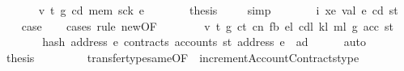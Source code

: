\begin{isabellebody}
\ \ \ \ \isamarkupfalse%
\ {\isacharparenleft}{\kern0pt}{}\ v\ t\ g\ cd{\isacharprime}{\kern0pt}\ mem{\isacharprime}{\kern0pt}\ sck{\isacharprime}{\kern0pt}\ e{\isacharprime}{\kern0pt}{\isacharparenright}{\kern0pt}\isanewline
\ \ \ \ \isamarkupfalse%
\ \isamarkupfalse%
\ {\isacharquery}{\kern0pt}thesis\ \isamarkupfalse%
\ {}{}\ \isamarkupfalse%
\ simp\isanewline
\ \ \isamarkupfalse%
\isanewline
{}\isamarkupfalse%
\isanewline
\ \ \isamarkupfalse%
\ {\isacharparenleft}{\kern0pt}{}{}\ i\ xe\ val\ e\ cd\ st{\isacharparenright}{\kern0pt}\isanewline
\ \ \isamarkupfalse%
\ {\isacharquery}{\kern0pt}case\isanewline
\ \ \isamarkupfalse%
\ {\isacharparenleft}{\kern0pt}cases\ rule{\isacharcolon}{\kern0pt}\ new{\isacharbrackleft}{\kern0pt}OF\ {}{}{\isacharparenleft}{\kern0pt}{}{\isacharparenright}{\kern0pt}{\isacharbrackright}{\kern0pt}{\isacharparenright}{\kern0pt}\isanewline
\ \ \ \ \isamarkupfalse%
\ {\isacharparenleft}{\kern0pt}{}\ v\ t\ g\ ct\ cn\ fb\ e\isactrlsub l\ cd\isactrlsub l\ k\isactrlsub l\ m\isactrlsub l\ g{\isacharprime}{\kern0pt}\ acc\ st{\isacharprime}{\kern0pt}{\isacharprime}{\kern0pt}{\isacharparenright}{\kern0pt}\isanewline
\ \ \ \ \isamarkupfalse%
\ \isamarkupfalse%
\ {\isachardoublequoteopen}hash\ {\isacharparenleft}{\kern0pt}address\ e{\isacharparenright}{\kern0pt}\ {\isasymlfloor}contracts\ {\isacharparenleft}{\kern0pt}accounts\ st\ {\isacharparenleft}{\kern0pt}address\ e{\isacharparenright}{\kern0pt}{\isacharparenright}{\kern0pt}{\isasymrfloor}\ {\isasymnoteq}\ ad{\isachardoublequoteclose}\ \isamarkupfalse%
\ {}{}{\isacharparenleft}{\kern0pt}{}{\isacharparenright}{\kern0pt}\ {}{\isacharparenleft}{\kern0pt}{}{\isacharparenright}{\kern0pt}\ \isamarkupfalse%
\ auto\isanewline
\ \ \ \ \isamarkupfalse%
\ \isamarkupfalse%
\ {\isacharquery}{\kern0pt}thesis\isanewline
\ \ \ \ \ \ \isamarkupfalse%
\ {}{}\ transfer{\isacharunderscore}{\kern0pt}type{\isacharunderscore}{\kern0pt}same{\isacharbrackleft}{\kern0pt}OF\ {}{\isacharparenleft}{\kern0pt}{}{\isacharparenright}{\kern0pt}{\isacharbrackright}{\kern0pt}\ incrementAccountContracts{\isacharunderscore}{\kern0pt}type\ \isamarkupfalse%

\end{isabellebody}
